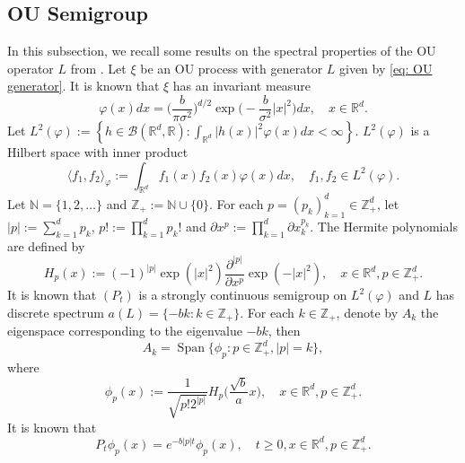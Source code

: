 \documentclass[12pt,a4paper]{amsart}
\theoremstyle{plain}
\theoremstyle{definition}
\numberwithin{equation}{section}
\begin{document}
\subsection{OU Semigroup}
    In this subsection, we recall some results on the spectral properties of the OU operator $L$ from \cite{GD}.
    Let $\xi$ be an OU process with generator $L$ given by \eqref{eq: OU generator}.
    It is known that $\xi$ has an invariant measure
\begin{equation}
\label{invariantdensity}
    \varphi(x)dx
    =\Big (\frac{b}{\pi \sigma^2}\Big )^{d/2}\exp \Big(-\frac{b}{\sigma^2}|x|^2 \Big)dx,
    \quad x\in \mathbb R^d.
\end{equation}
    Let $L^2(\varphi):= \left\{ h  \in \mathcal B(\mathbb R^d, \mathbb R): \int_{\mathbb R^d} |h(x)|^2 \varphi(x) dx < \infty \right\}$. $L^2(\varphi)$ is a Hilbert space with inner product
\begin{equation}
    \langle f_1, f_2 \rangle_{\varphi}
    := \int_{\mathbb R^d}f_1(x)f_2(x)\varphi(x) dx, \quad f_1,f_2 \in L^2(\varphi).
\end{equation}
     Let $\mathbb N = \{1,2,\dots\}$ and $\mathbb Z_+ := \mathbb N\cup\{0\}$.
     For each $p = (p_k)_{k = 1}^d \in \mathbb{Z}_+^{d}$,
    let $|p|:=\sum_{k=1}^d p_k$, $p!:= \prod_{k= 1}^d p_k !$ and $\partial x^p:= \prod_{k = 1}^d\partial x_k^{p_k}$.
    The Hermite polynomials are defined by
\begin{equation}
    H_p(x)
    :=(-1)^{|p|}\exp(|x|^2) \frac{\partial ^{|p|}}{\partial x^p} \exp(-|x|^2) ,
    \quad x\in \mathbb R^d,
    p \in \mathbb{Z}_+^{d}.
\end{equation}
    It is known that $(P_t)$ is a strongly continuous semigroup on $L^2(\varphi)$ and $L$ has
    discrete spectrum $a(L)= \{-bk: k \in \mathbb Z_+\}$.
    For each $k \in \mathbb Z_+$, denote by $A_k$ the eigenspace corresponding to the eigenvalue $-bk$, then
\begin{equation}
    A_k
    = \operatorname{Span} \{\phi_p : p\in \mathbb Z_+^d, |p|=k\},
\end{equation}
where
\begin{equation}\label{eigenfunction}
    \phi_p(x)
    := \frac{1}{\sqrt{ p! 2^{|p|} }} H_p \Big(\frac{ \sqrt{b} }{a}x \Big),
    \quad x\in \mathbb R^d, p\in \mathbb Z_+^d.
\end{equation}
    It is known that
\begin{equation}\label{semigroupformula}
    P_t\phi_p(x)
    =e^{-b|p|t}\phi_p(x),
    \quad t\geq 0, x\in \mathbb R^d, p\in \mathbb Z_+^d.
\end{equation}
\end{document}
